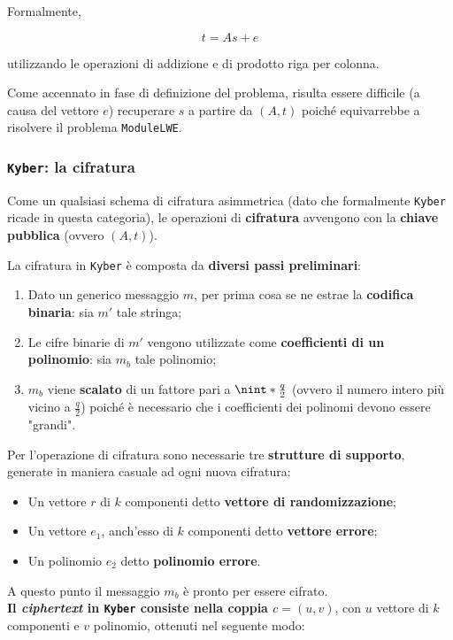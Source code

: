 \documentclass[a4paper, 12pt, oneside]{article}
\DeclarePairedDelimiter{\nint}\lfloor\rceil %
\theoremstyle{definition}
\begin{document}
Formalmente,

\[ t = As + e \]

utilizzando le operazioni di addizione e di prodotto riga per colonna.

Come accennato in fase di definizione del problema, risulta essere difficile (a causa del vettore $e$) recuperare $s$ a partire da $(A, t)$ poiché equivarrebbe a risolvere il problema \texttt{ModuleLWE}. 

\newpage
\subsubsection{\texttt{Kyber}: la cifratura}
Come un qualsiasi schema di cifratura asimmetrica (dato che formalmente \texttt{Kyber} ricade in questa categoria), le operazioni di \textbf{cifratura} avvengono con la \textbf{chiave pubblica} (ovvero $(A, t)$).

La cifratura in \texttt{Kyber} è composta da \textbf{diversi passi preliminari}:

\begin{enumerate}
    \item Dato un generico messaggio $m$, per prima cosa se ne estrae la \textbf{codifica binaria}: sia $m'$ tale stringa;
    \item Le cifre binarie di $m'$ vengono utilizzate come \textbf{coefficienti di un polinomio}: sia $m_b$ tale polinomio;
    \item $m_b$ viene \textbf{scalato} di un fattore pari a $\nint*{\frac{q}{2}}$ (ovvero il numero intero più vicino a $\frac{q}{2}$) poiché è necessario che i coefficienti dei polinomi devono essere "grandi".
\end{enumerate}

Per l'operazione di cifratura sono necessarie tre \textbf{strutture di supporto}, generate in maniera casuale ad ogni nuova cifratura:

\begin{itemize}
    \item Un vettore $r$ di $k$ componenti detto \textbf{vettore di randomizzazione};
    \item Un vettore $e_1$, anch'esso di $k$ componenti detto \textbf{vettore errore};
    \item Un polinomio $e_2$ detto \textbf{polinomio errore}.
\end{itemize}

A questo punto il messaggio $m_b$ è pronto per essere cifrato.\\ \textbf{Il \textit{ciphertext} in \texttt{Kyber} consiste nella coppia $c = (u, v)$}, con $u$ vettore di $k$ componenti e $v$ polinomio, ottenuti nel seguente modo:
\end{document}
